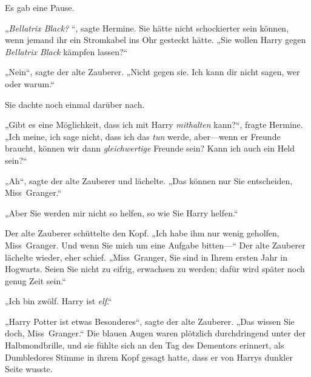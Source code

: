 Es gab eine Pause.

„\emph{Bellatrix Black? }“, sagte Hermine. Sie hätte nicht schockierter sein können, wenn jemand ihr ein Stromkabel ins Ohr gesteckt hätte. „Sie wollen Harry gegen \emph{Bellatrix Black} kämpfen lassen?“

„Nein“, sagte der alte Zauberer. „Nicht gegen sie. Ich kann dir nicht sagen, wer oder warum.“

Sie dachte noch einmal darüber nach.

„Gibt es eine Möglichkeit, dass ich mit Harry \emph{mithalten} kann?“, fragte Hermine. „Ich meine, ich sage nicht, dass ich das \emph{tun} werde, aber—wenn er Freunde braucht, können wir dann \emph{gleichwertige} Freunde sein? Kann ich auch ein Held sein?“

„Ah“, sagte der alte Zauberer und lächelte. „Das können nur Sie entscheiden, Miss~Granger.“

„Aber Sie werden mir nicht so helfen, so wie Sie Harry helfen.“

Der alte Zauberer schüttelte den Kopf. „Ich habe ihm nur wenig geholfen, Miss~Granger. Und wenn Sie mich um eine Aufgabe bitten—“ Der alte Zauberer lächelte wieder, eher schief. „Miss~Granger, Sie sind in Ihrem ersten Jahr in Hogwarts. Seien Sie nicht zu eifrig, erwachsen zu werden; dafür wird später noch genug Zeit sein.“

„Ich bin zwölf. Harry ist \emph{elf}.“

„Harry Potter ist etwas Besonderes“, sagte der alte Zauberer. „Das wissen Sie doch, Miss~Granger.“ Die blauen Augen waren plötzlich durchdringend unter der Halbmondbrille, und sie fühlte sich an den Tag des Dementors erinnert, als Dumbledores Stimme in ihrem Kopf gesagt hatte, dass er von Harrys dunkler Seite wusste.

